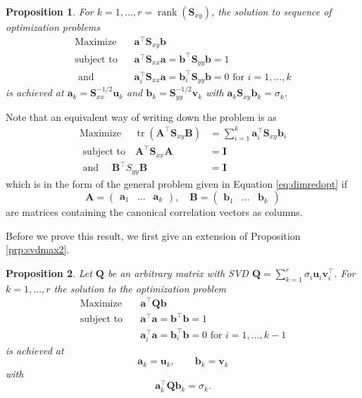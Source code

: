 \documentclass[]{book}
\newtheorem{proposition}{Proposition}[chapter]
\theoremstyle{definition}
\theoremstyle{definition}
\theoremstyle{definition}
\theoremstyle{remark}
\begin{document}
\begin{proposition}
\protect\hypertarget{prp:ccafull}{}{\label{prp:ccafull} }For \(k=1, \ldots, r = \operatorname{rank}(\boldsymbol S_{xy})\), the solution to sequence of optimization problems
\begin{align}
\mbox{Maximize} \quad &\boldsymbol a^\top \boldsymbol S_{xy}\boldsymbol b\\
\mbox{subject to }  \;\;&\boldsymbol a^\top \boldsymbol S_{xx}\boldsymbol a=\boldsymbol b^\top\boldsymbol S_{yy} \boldsymbol b=1\\
\mbox{ and }\;\;\;&\boldsymbol a_i^\top \boldsymbol S_{xx}\boldsymbol a=\boldsymbol b_i^\top \boldsymbol S_{yy}\boldsymbol b= 0 \mbox{ for }i=1, \ldots, k
\end{align}
is achieved at \(\boldsymbol a_k = \boldsymbol S_{xx}^{-1/2}\boldsymbol u_k\) and \(\boldsymbol b_k=\boldsymbol S_{yy}^{-1/2}\boldsymbol v_k\) with \(\boldsymbol a_k \boldsymbol S_{xy}\boldsymbol b_k = \sigma_k\).
\end{proposition}
Note that an equivalent way of writing down the problem is as
\begin{align*}
\mbox{Maximize } \quad \operatorname{tr}(\boldsymbol A^\top \boldsymbol S_{xy}\boldsymbol B) &= \sum_{i=1}^k \boldsymbol a_i^\top \boldsymbol S_{xy}\boldsymbol b_i\\
\mbox{ subject to} \quad \boldsymbol A^\top \boldsymbol S_{xx}\boldsymbol A&=\mathbf I\\
\mbox{ and }\quad \boldsymbol B^\top S_{yy}\boldsymbol B&= \mathbf I
\end{align*}
which is in the form of the general problem given in Equation \eqref{eq:dimredopt} if \[\boldsymbol A= \begin{pmatrix}\boldsymbol a_1&\ldots &\boldsymbol a_k\end{pmatrix}, \quad \boldsymbol B= \begin{pmatrix}\boldsymbol b_1&\ldots &\boldsymbol b_k\end{pmatrix}\]
are matrices containing the canonical correlation vectors as columns.

Before we prove this result, we first give an extension of Proposition \ref{prp:svdmax2}.

\begin{proposition}
\protect\hypertarget{prp:svdopt3}{}{\label{prp:svdopt3} }Let \(\boldsymbol Q\) be an arbitrary matrix with SVD \(\boldsymbol Q= \sum_{k=1}^r \sigma_i \boldsymbol u_i \boldsymbol v^\top_i\).
For \(k=1, \ldots, r\) the solution to the optimization problem
\begin{align}
\mbox{Maximize}\quad  &\boldsymbol a^\top \boldsymbol Q\boldsymbol b\\
\mbox{subject to} \quad &\boldsymbol a^\top \boldsymbol a= \boldsymbol b^\top \boldsymbol b=1\\
&\boldsymbol a_i^\top\boldsymbol a= \boldsymbol b_i^\top\boldsymbol b= 0 \mbox{ for } i = 1, \ldots, k-1
  \end{align}
is achieved at
\[\boldsymbol a_k=\boldsymbol u_k, \qquad \boldsymbol b_k = \boldsymbol v_k\]
with
\[\boldsymbol a_k^\top \boldsymbol Q\boldsymbol b_k = \sigma_k.\]
\end{proposition}
\end{document}
